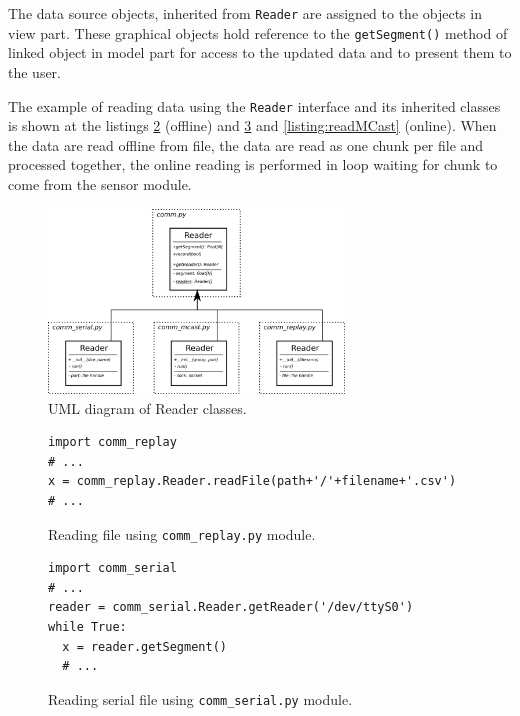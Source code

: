 The data source objects, inherited from \texttt{Reader} are assigned to the objects in view part. These graphical
objects hold reference to the \texttt{getSegment()} method of linked object in model part for access to the updated
data and to present them to the user.

The example of reading data using the \texttt{Reader} interface and its inherited classes is shown at the
listings \ref{listing:readFile} (offline) and  \ref{listing:readSerial} and \ref{listing:readMCast} (online).
When the data are read offline from file, the data are read as one chunk per file and processed together,
the online reading is performed in loop waiting for chunk to come from the sensor module.

\begin{figure}[!ht]
\begin{center}
\includegraphics[width=0.7\textwidth]{img/class_src.png}
\caption{UML diagram of Reader classes. \label{fig:class_src}}
\end{center}
\end{figure}

\begin{figure}[!ht]
\begin{lstlisting}[style=python]
import comm_replay
# ...
x = comm_replay.Reader.readFile(path+'/'+filename+'.csv')
# ...
\end{lstlisting}
\caption{Reading file using \texttt{comm\_replay.py} module.\label{listing:readFile}}
\end{figure}

\begin{figure}[!ht]
\begin{lstlisting}[style=python]
import comm_serial
# ...
reader = comm_serial.Reader.getReader('/dev/ttyS0')
while True:
  x = reader.getSegment()
  # ...
\end{lstlisting}
\caption{Reading serial file using \texttt{comm\_serial.py} module.\label{listing:readSerial}}
\end{figure}

